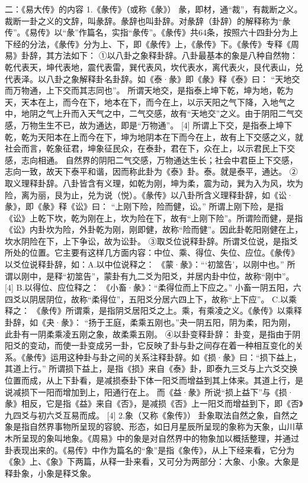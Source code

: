 \documentclass[a4paper,12pt,UTF8,twoside]{ctexbook}
\begin{document}
二：《易大传》的内容
1.《彖传》（或称《彖》）
彖，即材，通“裁”，有裁断之义。裁断一卦之义的文辞，叫彖辞。彖辞也叫卦辞。对彖辞（卦辞）的解释称为“彖传”。《易传》以“彖”作篇名，实指“彖传”。《彖传》共64条，按照六十四卦分为上下经的分法，《彖传》分为上、下，即《彖传》上，《彖传》下。《彖传》专释《周易》卦辞，其方法如下：
①以八卦之象释卦辞。八卦最基本的象是八种自然物：乾代表天，坤代表地，震代表雷，巽代表风，坎代表水，离代表火，艮代表山，兑代表泽。以八卦之象解释卦名卦辞。如《泰·彖》即《彖》释《泰》曰：
“天地交而万物通，上下交而其志同也”。
所谓天地交，是指泰上坤下乾，坤为地，乾为天，天本在上，而今在下，地本在下，而今在上，以示天阳之气下降，入地气之中，地阴之气上升而入天气之中，二气交感，故有“天地交”之义。由于阴阳二气交感，万物生生不已，故为通达，即是“万物通”。 [4]
所谓上下交，是指泰上坤下乾，乾为天阳本在上而今在下，坤为地阴本在下而今在上，故有上下交感之义，就社会而言，乾象征君，坤象征民众，在泰卦，君在下，众在上，以示君民上下交感，志向相通。
自然界的阴阳二气交感，万物通达生长；社会中君臣上下交感，志向一致，故天下泰平和谐，因而称此卦为《泰》卦。泰。就是泰平，通达。
②取义理释卦辞。八卦皆含有义理，如乾为刚，坤为柔，震为动，巽为入为风，坎为险，离为丽，艮为止，兑为说（悦）。《彖传》以八卦所含义理释卦辞，如《讼·彖》，即《彖》释《讼》曰：
“上刚下险，险而健，讼。”
所谓上刚下险，是指《讼》上乾下坎，乾为刚在上，坎为险在下，故有“上刚下险”。所谓险而健，是指《讼》内卦坎为险，外卦乾为刚，刚即健，故称“险而健”。因此卦乾阳刚健在上，坎水阴险在下，上下争讼，故为讼卦。
③取爻位说释卦辞。所谓爻位说，是指爻所处的位置。它主要有这样几方面内容：中位、乘、得位、失位、应位。《彖传》以爻位说释卦辞，如：A.以中位说释之：
《蒙·彖》：“‘初筮告’，以刚中也。”
所谓以刚中，是释“初筮告”，蒙卦有九二爻为阳爻，并居内卦中位，故称“刚中”。 [4]
B.以得位、应位释之：
《小畜·彖》：“柔得位而上下应之。”
小畜一阴五阳，六四爻以阴居阴位，故称“柔得位”，五阳爻分居六四上下，故称“上下应”。
C.以乘释之：
《彖传》所谓乘，是指阴爻居阳爻之上。乘，有乘凌之义。《彖传》以乘释卦辞，如《夬·彖》：
“扬于王庭，柔乘五刚也。”夬一阴五阳，阴为柔，阳为刚，此卦有一阴柔乘凌五刚之象，故柔乘五刚。
④以卦变释卦辞：
卦变，是指由于阴阳爻的变动，而使一卦变成另一卦，它反映了卦与卦之间存在着一种相互变化的关系。《彖传》运用这种卦与卦之间的关系注释卦辞。如《损·彖》曰：“损下益上，其道上行。”
所谓损下益上，是指《损》来自《泰》卦，即泰九三爻与上六爻交换位置而成，从上下卦看，是减损泰卦下体一阳爻而增益到其上体来。其道上行，是说减损下一阳而增加到上，阳通行在上。
而《益·彖》所说“损上益下”与《损·彖》相反，它是指《益》来自《否》，是减损《否》上一阳爻而增益到下，即《否》九四爻与初六爻互易而成。 [4]
2.象（又称《象传》）
卦象取法自然之象，自然之象是指自然界事物所呈现的容貌、形态，如日月星辰所呈现的象称为天象，山川草木所呈现的象叫地象。《周易》中的象是对自然界中的物象加以概括整理，并通过卦表现出来的。《易传》中作为篇名的“象”是指《象传》，从上下经来看，它分为《象》上、《象》下两篇，从释一卦来看，又可分为两部分：大象、小象。大象是释卦象，小象是释爻象。
\end{document}
